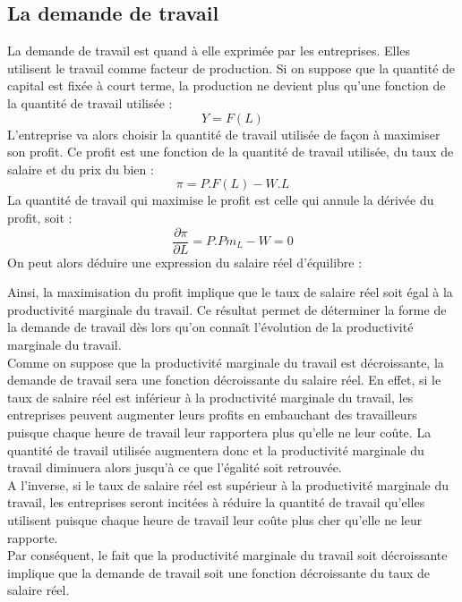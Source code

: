 \documentclass[10pt]{book}
\begin{document}
\subsection{La demande de travail}
La demande de travail est quand à elle exprimée par les entreprises. Elles utilisent le travail comme facteur de production. Si on suppose que la quantité de capital est fixée à court terme, la production ne devient plus qu'une fonction de la quantité de travail utilisée :
$$ Y = F(L)$$
L'entreprise va alors choisir la quantité de travail utilisée de façon à maximiser son profit. Ce profit est une fonction de la quantité de travail utilisée, du taux de salaire et du prix du bien :
$$ \pi = P.F(L) - W.L$$
La quantité de travail qui maximise le profit est celle qui annule la dérivée du profit, soit :
$$\frac{\partial \pi}{\partial L} = P.Pm_L - W = 0$$
On peut alors déduire une expression du salaire réel d'équilibre : 
\begin{center}
\end{center}
Ainsi, la maximisation du profit implique que le taux de salaire réel soit égal à la productivité marginale du travail. Ce résultat permet de déterminer la forme de la demande de travail dès lors qu'on connaît l'évolution de la productivité marginale du travail. \\
Comme on suppose que la productivité marginale du travail est décroissante, la demande de travail sera une fonction décroissante du salaire réel. En effet, si le taux de salaire réel est inférieur à la productivité marginale du travail, les entreprises peuvent augmenter leurs profits en embauchant des travailleurs puisque chaque heure de travail leur rapportera plus qu'elle ne leur coûte. La quantité de travail utilisée augmentera donc et la productivité marginale du travail diminuera alors jusqu'à ce que l'égalité soit retrouvée. \\
A l'inverse, si le taux de salaire réel est supérieur à la productivité marginale du travail, les entreprises seront incitées à réduire la quantité de travail qu'elles utilisent puisque chaque heure de travail leur coûte plus cher qu'elle ne leur rapporte. \\
Par conséquent, le fait que la productivité marginale du travail soit décroissante implique que la demande de travail soit une fonction décroissante du taux de salaire réel. \\
\end{document}
